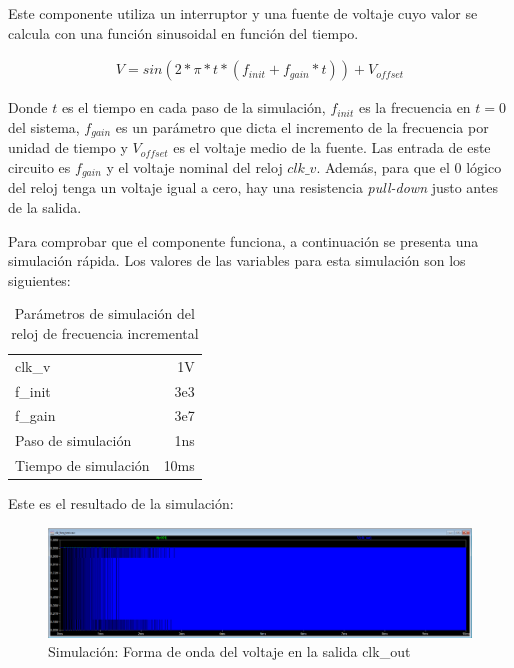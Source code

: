 \documentclass[12pt]{report} %
\begin{document}
	Este componente utiliza un interruptor y una fuente de voltaje cuyo valor se calcula con una función sinusoidal en función del tiempo.
	\begin{figure}[H]
		\label{sw-capacities-v_eq}
		\begin{equation}
		\begin{array}{c}
		V=sin(2*\pi*t*(f_{init}+f_{gain}*t))+V_{offset}
		\end{array}
		\end{equation}
	\end{figure}
	
	Donde $t$ es el tiempo en cada paso de la simulación, $f_{init}$ es la frecuencia en $t=0$ del sistema, $f_{gain}$ es un parámetro que dicta el incremento de la frecuencia por unidad de tiempo y $V_{offset}$ es el voltaje medio de la fuente. Las entrada de este circuito es $f_{gain}$ y el voltaje nominal del reloj $clk\_v$. Además, para que el 0 lógico del reloj tenga un voltaje igual a cero, hay una resistencia \textit{pull-down} justo antes de la salida.
	
	Para comprobar que el componente funciona, a continuación se presenta una simulación rápida. Los valores de las variables para esta simulación son los siguientes:
	\begin{table}[H]
		\label{tab:parameters-clk-freq-sim}
		\caption{Parámetros de simulación del reloj de frecuencia incremental}
		\begin{tabular}{lr}
			clk\_v & 1V \\
			f\_init & 3e3 \\
			f\_gain & 3e7 \\
			Paso de simulación & 1ns \\
			Tiempo de simulación & 10ms
		\end{tabular}
	\end{table}

	Este es el resultado de la simulación:
	
	\begin{figure}[H]
		\includegraphics[width=1\textwidth]{clk-freq-sim-waveform.PNG}
		\caption[Simulación: Forma de onda del voltaje en la salida clk\_out]{Simulación: Forma de onda del voltaje en la salida clk\_out}
		\label{fig:clk-freq-sim-waveform.PNG}
	\end{figure}
	
\end{document}
